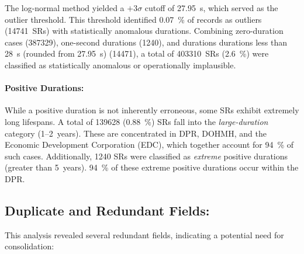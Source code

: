 \documentclass[linenumber]{jdsart}
\begin{document}
The log-normal method yielded a $+3\sigma$ cutoff
of \SI{27.95}{\second}, which served as the outlier threshold.
This threshold identified
\SI[round-mode=places, round-precision=2]{0.07}{\percent}
of records as outliers (\num{14741}~SRs) with statistically
anomalous durations. Combining zero-duration cases (\num{387329}),
one-second durations (\num{1240}),
and durations durations less than \SI{28}{\second} (rounded 
from \SI{27.95}{\second}) (\num{14471}), a total of \num{403310}~SRs
(\SI{2.6}{\percent}) were classified as statistically anomalous
or operationally implausible.


\paragraph{Positive Durations:}
\label{par:positivedurations}
While a positive duration is not inherently erroneous, some SRs exhibit
extremely long lifespans. A total of \num{139628}
(\SI[round-mode=places, round-precision=2]{0.88}{\percent})
SRs fall into the \emph{large-duration} category
(1--2~years). These are concentrated in DPR, DOHMH, and the
Economic Development Corporation (\textsc{EDC}),
which together account for \SI{94}{\percent} of such cases. Additionally, 
\num{1240} SRs were classified as \emph{extreme} positive 
durations (greater than 5~years). \SI{94}{\percent} of these extreme positive 
durations occur within the DPR.



\subsection{Duplicate and Redundant Fields:}
\label{sec:redundant} 
This analysis revealed several redundant fields, indicating a 
potential need for consolidation:
\end{document}
